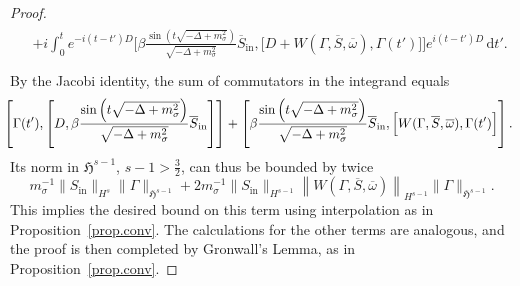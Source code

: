 \documentclass[10pt]{amsart}
\theoremstyle{definition}\newtheorem{defi}[theo]{Definition}\newtheorem{rema}[theo]{Remark}\newtheorem{exam}[theo]{Example}\newtheorem{exem}[theo]{Example}\newtheorem{nota}[theo]{Notation}
\newcommand{\rmin}{\mathrm{in}}
\newcommand{\gH}{\mathfrak{H}}
\renewcommand\d[1]{{\ensuremath{\,\text{d}#1}}}
\begin{document}
\begin{proof}
\begin{multline*}
\begin{aligned}
&+ i\int_0^t e^{-i(t-t')D}\Big[\beta \frac{\sin\left(t\sqrt{-\Delta + m^2_\sigma}\right)}{\sqrt{-\Delta + m^2_\sigma}}\overline{S}_\rmin, \Big[D+W\left(\Gamma, \overline{S}, \overline{\omega}\right),\Gamma(t')\Big]\Big]e^{i(t-t')D}\d t'. \\
\end{aligned}
\end{multline*}
By the Jacobi identity, the sum of commutators in the integrand equals
\begin{equation*}
\mkern-10mu\left[\Gamma(t'), \left[D,\beta \frac{\sin\left(t\sqrt{-\Delta + m^2_\sigma}\right)}{\sqrt{-\Delta + m^2_\sigma}}\overline{S}_\rmin\right]\right] + \left[\beta \frac{\sin\left(t\sqrt{-\Delta + m^2_\sigma}\right)}{\sqrt{-\Delta + m^2_\sigma}}\overline{S}_\rmin, \Big[W(\Gamma, \overline{S}, \overline{\omega}),\Gamma(t')\Big]\right].
\end{equation*}
Its norm in $\gH^{s-1}$, $s-1>\tfrac32$, can thus be bounded by twice
\begin{equation*}
m_\sigma^{-1}\|S_\rmin\|_{H^s} \|\Gamma \|_{\gH^{s-1}} + 2m_\sigma^{-1}\|S_\rmin\|_{H^{s-1}} \left\|W(\Gamma, \overline{S}, \overline{\omega})\right\|_{H^{s-1}} \|\Gamma \|_{\gH^{s-1}}.
\end{equation*}
This implies the desired bound on this term using interpolation as in Proposition~\ref{prop.conv}. The calculations for the other terms are analogous, and the proof is then completed by Gronwall's Lemma, as in Proposition~\ref{prop.conv}.
\end{proof}
\end{document}
